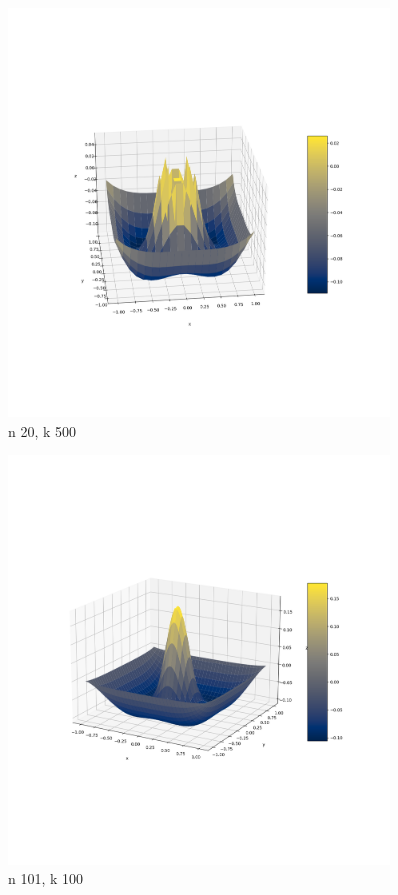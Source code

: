 \documentclass{article}
\begin{document}
    \begin{figure}[h]
        \centering
        \includegraphics[width=0.9\textwidth]{nal1_n20_k500.png}
        \caption{n 20, k 500}
    \end{figure}

    \begin{figure}[h]
        \centering
        \includegraphics[width=0.9\textwidth]{nal1_n101_k100.png}
        \caption{n 101, k 100}
    \end{figure}
\end{document}
